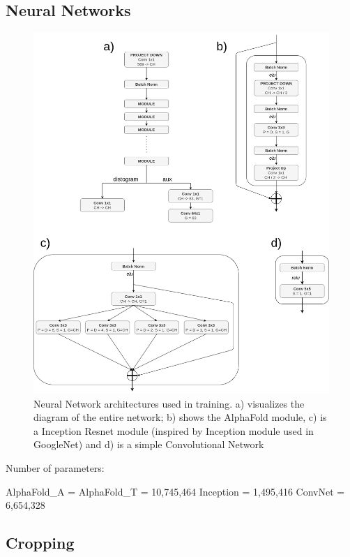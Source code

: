 \subsection{Neural Networks}

\begin{figure}
    \centering
    \includegraphics[width=\linewidth]{imgs_tomas/Architectures.png}
    \caption{Neural Network architectures used in training. a) visualizes the diagram of the entire network; b) shows the AlphaFold module, c) is a Inception Resnet module (inspired by Inception module used in GoogleNet) and d) is a simple Convolutional Network}
    \label{fig:architectures}
\end{figure}

Number of parameters:

AlphaFold\_A = 
AlphaFold\_T = 10,745,464
Inception = 1,495,416
ConvNet = 6,654,328

\subsection{Cropping}

